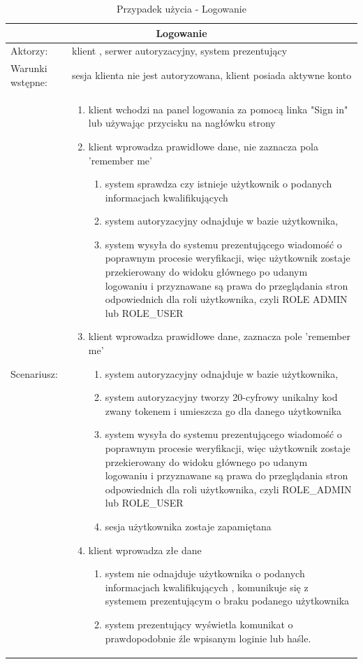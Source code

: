 \begin{table}[h!]
\begin{tabular}{ |p{2cm}||p{13cm}|  }
	
	\hline
	\multicolumn{2}{|c|}{Logowanie} \\
	\hline
Aktorzy: &klient , serwer autoryzacyjny, system prezentujący\\
	\hline
Warunki wstępne: & sesja klienta nie jest autoryzowana, klient posiada aktywne konto\\
	\hline
	Scenariusz: &
	\begin{enumerate}
		\item klient wchodzi na panel logowania za pomocą linka "Sign in" lub używając przycisku na nagłówku strony 
		\item klient wprowadza prawidłowe dane, nie zaznacza pola 'remember me'
		\begin{enumerate}
			\item system sprawdza czy istnieje użytkownik o podanych informacjach kwalifikujących
			\item system autoryzacyjny odnajduje w bazie użytkownika,
			\item system wysyła do systemu prezentującego wiadomość o poprawnym procesie weryfikacji, więc użytkownik zostaje przekierowany do widoku głównego po udanym logowaniu i przyznawane są prawa do przeglądania stron odpowiednich dla roli użytkownika, czyli ROLE ADMIN lub ROLE\_USER
		\end{enumerate}
		\item klient wprowadza prawidłowe dane,  zaznacza pole 'remember me'	
		\begin{enumerate}
			\item system autoryzacyjny odnajduje w bazie użytkownika,
			\item system autoryzacyjny tworzy 20-cyfrowy unikalny kod zwany tokenem i umieszcza go dla danego użytkownika
			\item system wysyła do systemu prezentującego wiadomość o poprawnym procesie weryfikacji, więc użytkownik zostaje przekierowany do widoku głównego po udanym logowaniu i przyznawane są prawa do przeglądania stron odpowiednich dla roli użytkownika, czyli ROLE\_ADMIN lub ROLE\_USER
			\item sesja użytkownika zostaje zapamiętana
		\end{enumerate}
		\item klient wprowadza złe dane
		\begin{enumerate}
			\item	system nie odnajduje użytkownika o podanych informacjach kwalifikujących , komunikuje się z systemem prezentującym o braku podanego użytkownika
			\item  system prezentujący wyświetla komunikat o prawdopodobnie źle wpisanym loginie lub haśle.
		\end{enumerate}
	\end{enumerate}
	\\
	\hline

\end{tabular}
	\caption{Przypadek użycia - Logowanie}
\end{table}


